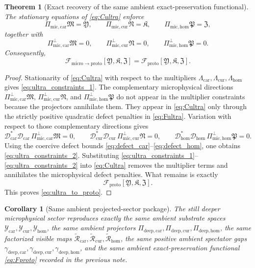 \documentclass[11pt]{article}
\newcommand{\ProtoFunctional}{\mathscr F_{\mathrm{proto}}}
\newcommand{\ProtoTensorClass}{\mathscr Y_{\mathrm{car}}}
\newcommand{\ProtoRelabelClass}{\mathscr Y_{\mathrm{cur}}}
\newcommand{\ProtoFreeClass}{\mathscr Y_{\mathrm{hom}}}
\newcommand{\ProtoTensor}{\mathfrak Y}
\newcommand{\ProtoRelabel}{\mathfrak K}
\newcommand{\ProtoFree}{\mathfrak Z}
\newcommand{\ProtoCarProj}{\Pi_{\mathrm{deep,car}}}
\newcommand{\ProtoCurProj}{\Pi_{\mathrm{deep,cur}}}
\newcommand{\ProtoHomProj}{\Pi_{\mathrm{deep,hom}}}
\newcommand{\ProtoCarRead}{\widetilde{\mathcal R}_{\mathrm{car}}}
\newcommand{\ProtoCurRead}{\widetilde{\mathcal R}_{\mathrm{cur}}}
\newcommand{\ProtoHomRead}{\widetilde{\mathcal R}_{\mathrm{hom}}}
\newcommand{\ProtoCarGap}{\gamma_{\mathrm{deep,car}}}
\newcommand{\ProtoCurGap}{\gamma_{\mathrm{deep,cur}}}
\newcommand{\ProtoHomGap}{\gamma_{\mathrm{deep,hom}}}
\newcommand{\UltraToProto}{\mathscr F_{\mathrm{micro}\to\mathrm{proto}}}
\newcommand{\UltraTensor}{\mathfrak M}
\newcommand{\UltraRelabel}{\mathfrak N}
\newcommand{\UltraFree}{\mathfrak P}
\newcommand{\UltraCarProj}{\Pi_{\mathrm{mic,car}}}
\newcommand{\UltraCurProj}{\Pi_{\mathrm{mic,cur}}}
\newcommand{\UltraHomProj}{\Pi_{\mathrm{mic,hom}}}
\newcommand{\UltraCarPerp}{\Pi_{\mathrm{mic,car}}^{\perp}}
\newcommand{\UltraCurPerp}{\Pi_{\mathrm{mic,cur}}^{\perp}}
\newcommand{\UltraHomPerp}{\Pi_{\mathrm{mic,hom}}^{\perp}}
\newcommand{\TensorDefect}{\mathcal D_{\mathrm{car}}}
\newcommand{\CurDefect}{\mathcal D_{\mathrm{cur}}}
\newcommand{\HomDefect}{\mathcal D_{\mathrm{hom}}}
\newtheorem{corollary}{Corollary}
\newtheorem{theorem}{Theorem}
\begin{document}
\begin{theorem}[Exact recovery of the same ambient exact-preservation functional]
\label{thm:recoverproto}
The stationary equations of \eqref{eq:Cultra} enforce
\begin{equation}
\UltraCarProj\UltraTensor=\ProtoTensor,
\qquad
\UltraCurProj\UltraRelabel=\ProtoRelabel,
\qquad
\UltraHomProj\UltraFree=\ProtoFree,
\label{eq:ultra_constraints_1}
\end{equation}
together with
\begin{equation}
\UltraCarPerp\UltraTensor=0,
\qquad
\UltraCurPerp\UltraRelabel=0,
\qquad
\UltraHomPerp\UltraFree=0.
\label{eq:ultra_constraints_2}
\end{equation}
Consequently,
\begin{equation}
\UltraToProto[\ProtoTensor,\ProtoRelabel,\ProtoFree]
=
\ProtoFunctional[\ProtoTensor,\ProtoRelabel,\ProtoFree].
\label{eq:ultra_to_proto}
\end{equation}
\end{theorem}

\begin{proof}
Stationarity of \eqref{eq:Cultra} with respect to the multipliers \(\Lambda_{\mathrm{car}},\Lambda_{\mathrm{cur}},\Lambda_{\mathrm{hom}}\) gives \eqref{eq:ultra_constraints_1}. The complementary microphysical directions \(\UltraCarPerp\UltraTensor\), \(\UltraCurPerp\UltraRelabel\), and \(\UltraHomPerp\UltraFree\) do not appear in the multiplier constraints because the projectors annihilate them. They appear in \eqref{eq:Cultra} only through the strictly positive quadratic defect penalties in \eqref{eq:Fultra}. Variation with respect to those complementary directions gives
\[
\TensorDefect^*\TensorDefect\,\UltraCarPerp\UltraTensor=0,
\qquad
\CurDefect^*\CurDefect\,\UltraCurPerp\UltraRelabel=0,
\qquad
\HomDefect^*\HomDefect\,\UltraHomPerp\UltraFree=0.
\]
Using the coercive defect bounds \eqref{eq:defect_car}--\eqref{eq:defect_hom}, one obtains \eqref{eq:ultra_constraints_2}. Substituting \eqref{eq:ultra_constraints_1}--\eqref{eq:ultra_constraints_2} into \eqref{eq:Cultra} removes the multiplier terms and annihilates the microphysical defect penalties. What remains is exactly
\[
\ProtoFunctional[\ProtoTensor,\ProtoRelabel,\ProtoFree].
\]
This proves \eqref{eq:ultra_to_proto}.
\end{proof}

\begin{corollary}[Same ambient projected-sector package]
\label{cor:sameproto}
The still deeper microphysical sector reproduces exactly the same ambient substrate spaces \(\ProtoTensorClass,\ProtoRelabelClass,\ProtoFreeClass\), the same ambient projectors \(\ProtoCarProj,\ProtoCurProj,\ProtoHomProj\), the same factorized visible maps \(\ProtoCarRead,\ProtoCurRead,\ProtoHomRead\), the same positive ambient spectator gaps \(\ProtoCarGap,\ProtoCurGap,\ProtoHomGap\), and the same ambient exact-preservation functional \eqref{eq:Fproto} recorded in the previous note.
\end{corollary}
\end{document}
